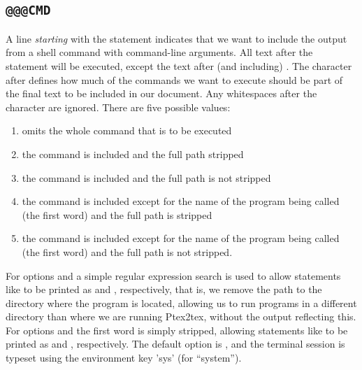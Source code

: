 \documentclass[a4paper,11pt]{article}
\begin{document}
{\subsection{\texttt{@@@CMD}}
A line \emph{starting} with the statement  indicates that we want to include
the output from a shell command with command-line arguments. All text after
the statement  will be executed, except the text after (and including)
. The character after  defines how much of the commands we
want to execute should be part of the final text to be included in our
document. Any whitespaces after the character are ignored. There are five possible values:
\begin{enumerate}
\item
{} omits the whole command that is to be executed
\item
{} the command is included and the full path stripped
\item
{} the command is included and the full path is not stripped
\item
{} the command is included except for the name of the program being
called (the first word) and the full path is stripped
\item
{} the command is included except for the name of the program being
called (the first word) and the full path is not stripped.
\end{enumerate}
For options  and  a simple regular expression search is used
to allow statements like 
to be printed as  and ,
respectively, that is, we remove the path to the directory where
the program is located, allowing us to run programs in a different directory
than where we are running Ptex2tex, without the output reflecting this.
For options  and  the first word is simply stripped,
allowing statements like  to be printed as 
and , respectively. The default option is ,
and the terminal session is typeset using the environment key 'sys' (for ``system'').

}
\end{document}
